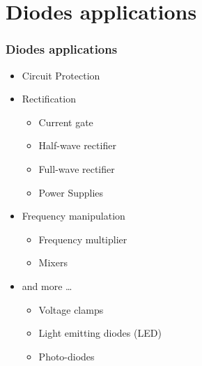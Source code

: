 \documentclass[beamer]{standalone}
\begin{document}
{\begin{columns}[c]
\begin{column}{.35\textwidth}
\begin{figure}
    \end{figure}
  \end{column}
\end{columns}
}

\section{Diodes applications}
\frame
{ \frametitle{Diodes applications}
\begin{itemize}
  \item 
    Circuit Protection
  \item 
    Rectification
    \begin{itemize}
      \item Current gate
      \item Half-wave rectifier
      \item Full-wave rectifier
      \item Power Supplies
    \end{itemize}
  \item 
    Frequency manipulation
    \begin{itemize}
      \item Frequency multiplier
      \item Mixers
    \end{itemize}
  \item 
    and more \ldots
    \begin{itemize}
      \item Voltage clamps
      \item Light emitting diodes (LED)
      \item Photo-diodes
    \end{itemize}
\end{itemize}
}
  
\end{document}
